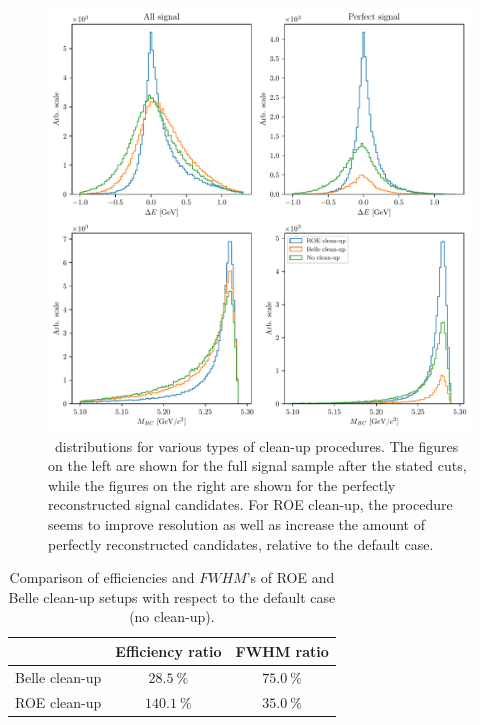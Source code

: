\begin{figure}[H]
	\centering
	\captionsetup{width=0.8\linewidth}
	\includegraphics[width=\linewidth]{fig/roe_opt}
	\caption{\vars~distributions for various types of clean-up procedures. The figures on the left are shown for the full signal sample after the stated cuts, while the figures on the right are shown for the perfectly reconstructed signal candidates. For ROE clean-up, the procedure seems to improve resolution as well as increase the amount of perfectly reconstructed candidates, relative to the default case.}
	\label{fig:roeopt}
\end{figure}

\begin{table}[H]
	\centering
	\begin{tabular}{c|c|c}
		& Efficiency ratio & FWHM ratio \\
		\toprule
		Belle clean-up & $28.5~\%$  & $75.0~\%$  \\
		ROE clean-up & $140.1~\%$ & $35.0~\%$ \\
		\bottomrule
	\end{tabular}
	\captionsetup{width=.8\linewidth}
	\caption{Comparison of efficiencies and $FWHM$'s of ROE and Belle clean-up setups with respect to the default case (no clean-up).}
	\label{tab:roeeff}
\end{table}

